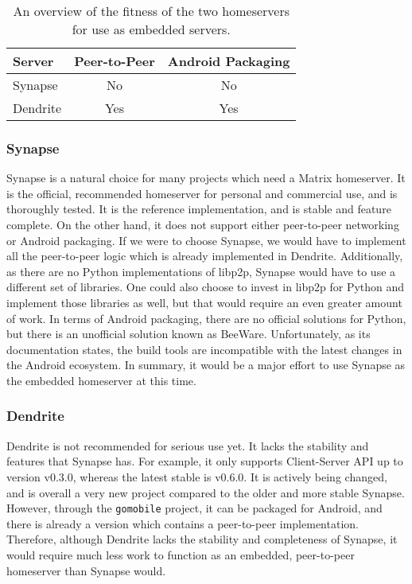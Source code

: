 \begin{table}[t]
	\center{}
	\begin{tabular}{lcc}
		\textbf{Server} & \multicolumn{1}{l}{\textbf{Peer-to-Peer}} & \multicolumn{1}{l}{\textbf{Android Packaging}} \\ \toprule
		Synapse         & No                                        & No                                             \\
		Dendrite        & Yes                                       & Yes
	\end{tabular}
	\caption{An overview of the fitness of the two homeservers for use as embedded servers.}\label{tab:homeserver_comparison}
\end{table}

\subsubsection{Synapse}
Synapse is a natural choice for many projects which need a Matrix homeserver.
It is the official, recommended homeserver for personal and commercial use, and is thoroughly tested.
It is the reference implementation, and is stable and feature complete.
On the other hand, it does not support either peer-to-peer networking or Android packaging.
If we were to choose Synapse, we would have to implement all the peer-to-peer logic which is already implemented in Dendrite.
Additionally, as there are no Python implementations of libp2p, Synapse would have to use a different set of libraries.
One could also choose to invest in libp2p for Python and implement those libraries as well, but that would require an even greater amount of work.
In terms of Android packaging, there are no official solutions for Python, but there is an unofficial solution known as BeeWare\footnotemark.
Unfortunately, as its documentation states\footnotemark, the build tools are incompatible with the latest changes in the Android ecosystem.
In summary, it would be a major effort to use Synapse as the embedded homeserver at this time.

\subsubsection{Dendrite}
Dendrite is not recommended for serious use yet.
It lacks the stability and features that Synapse has.
For example, it only supports Client-Server API up to version v0.3.0, whereas the latest stable is v0.6.0.
It is actively being changed, and is overall a very new project compared to the older and more stable Synapse.
However, through the \texttt{gomobile} project, it can be packaged for Android, and there is already a version which contains a peer-to-peer implementation.
Therefore, although Dendrite lacks the stability and completeness of Synapse, it would require much less work to function as an embedded, peer-to-peer homeserver than Synapse would.

